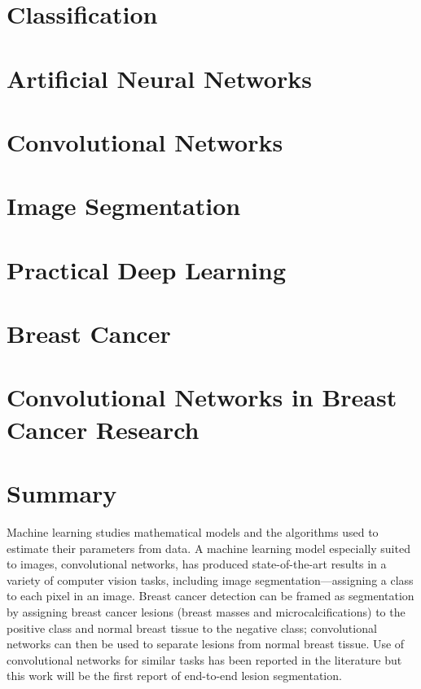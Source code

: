 \section{Classification}
\label{sec:Classification}


\section{Artificial Neural Networks}
\label{sec:ANNs}


\section{Convolutional Networks}
\label{sec:ConvNets}


\section{Image Segmentation}
\label{sec:Segmentation}
 

\section{Practical Deep Learning}
\label{sec:PracticalDL}


\section{Breast Cancer}
\label{sec:BreastCancer}


\section{Convolutional Networks in Breast Cancer Research}
\label{sec:BreastCancerConvNets}


\section{Summary}
Machine learning studies mathematical models and the algorithms used to estimate their parameters from data. A machine learning model especially suited to images, convolutional networks, has produced state-of-the-art results in a variety of computer vision tasks, including image segmentation---assigning a class to each pixel in an image.
Breast cancer detection can be framed as segmentation by assigning breast cancer lesions (breast masses and microcalcifications) to the positive class and normal breast tissue to the negative class; convolutional networks can then be used to separate lesions from normal breast tissue. Use of convolutional networks for similar tasks has been reported in the literature but this work will be the first report of end-to-end lesion segmentation.
